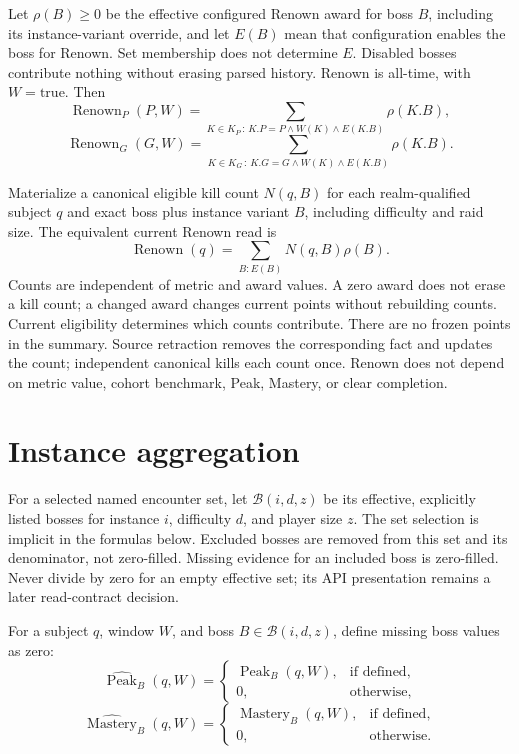 \documentclass[11pt]{article}
\begin{document}
Let $\rho(B)\ge0$ be the effective configured Renown award for boss $B$, including its instance-variant override, and let $E(B)$ mean that configuration enables the boss for Renown. Set membership does not determine $E$. Disabled bosses contribute nothing without erasing parsed history. Renown is all-time, with $W=\mathrm{true}$. Then
\[
  \operatorname{Renown}_P(P,W)
  =\sum_{K\in K_P\,:\,K.P=P\land W(K)\land E(K.B)}\rho(K.B),
\]
\[
  \operatorname{Renown}_G(G,W)
  =\sum_{K\in K_G\,:\,K.G=G\land W(K)\land E(K.B)}\rho(K.B).
\]

Materialize a canonical eligible kill count $N(q,B)$ for each realm-qualified subject $q$ and exact boss plus instance variant $B$, including difficulty and raid size. The equivalent current Renown read is
\[
 \operatorname{Renown}(q)=\sum_{B:E(B)}N(q,B)\rho(B).
\]
Counts are independent of metric and award values. A zero award does not erase a kill count; a changed award changes current points without rebuilding counts. Current eligibility determines which counts contribute. There are no frozen points in the summary. Source retraction removes the corresponding fact and updates the count; independent canonical kills each count once. Renown does not depend on metric value, cohort benchmark, Peak, Mastery, or clear completion.

\section{Instance aggregation}
For a selected named encounter set, let $\mathcal{B}(i,d,z)$ be its effective, explicitly listed bosses for instance $i$, difficulty $d$, and player size $z$. The set selection is implicit in the formulas below. Excluded bosses are removed from this set and its denominator, not zero-filled. Missing evidence for an included boss is zero-filled. Never divide by zero for an empty effective set; its API presentation remains a later read-contract decision.

For a subject $q$, window $W$, and boss $B\in\mathcal{B}(i,d,z)$, define missing boss values as zero:
\[
\widehat{\operatorname{Peak}}_B(q,W)=
\begin{cases}
\operatorname{Peak}_B(q,W), & \text{if defined},\\
0, & \text{otherwise},
\end{cases}
\]
\[
\widehat{\operatorname{Mastery}}_B(q,W)=
\begin{cases}
\operatorname{Mastery}_B(q,W), & \text{if defined},\\
0, & \text{otherwise}.
\end{cases}
\]
\end{document}
